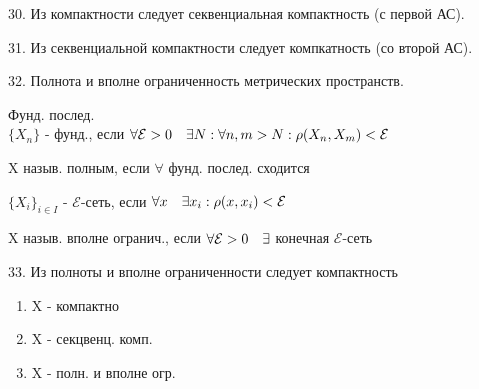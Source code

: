 \documentclass[11pt, fleqn]{article}
\begin{document}
    \begin{question}{30. Из компактности следует секвенциальная компактность (с первой АС).}
        
    \end{question}

    \begin{question}{31. Из секвенциальной компактности следует компкатность (со второй АС).}
        
    \end{question}

    \begin{question}{32. Полнота и вполне ограниченность метрических пространств.}
        \begin{definition} 
            Фунд. послед.\\
            $\{X_n\}$ - фунд., если $\forall \mathcal{E} > 0 \quad \exists N: \forall n, m > N: \rho(X_n, X_m) < \mathcal{E}$
        \end{definition}

        \begin{definition} 
            X назыв. полным, если $\forall$ фунд. послед. сходится
        \end{definition}

        \begin{definition} 
            $\{X_i\}_{i \in I}$ - $\mathcal{E}$-сеть, если $\forall x \quad \exists x_i: \rho(x, x_i) < \mathcal{E}$
        \end{definition}

        \begin{definition} 
            X назыв. вполне огранич., если $\forall \mathcal{E} > 0 \quad \exists$ конечная $\mathcal{E}$-сеть
        \end{definition}
    \end{question}

    \begin{question}{33. Из полноты и вполне ограниченности следует компактность}
        \begin{theorem} [равносильные]
                \begin{enumerate}
                    \item X - компактно
                    \item X - секцвенц. комп.
                    \item X - полн. и вполне огр.
                \end{enumerate}
        \end{theorem}
    \end{question}
\end{document}
